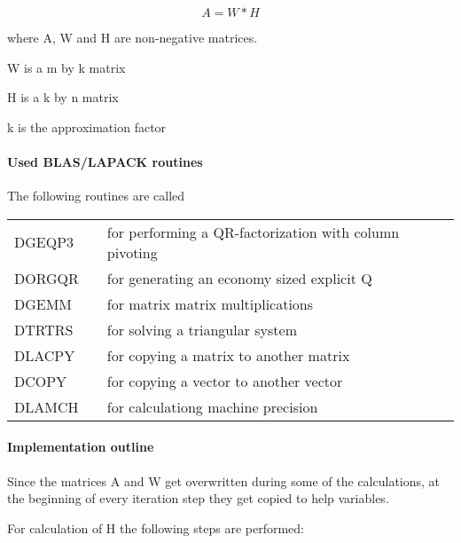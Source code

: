 \documentclass[a4paper,10pt]{scrartcl}
\begin{document}
					\begin{equation*}
						A = W * H
					\end{equation*}

 					where A, W and H are non-negative matrices.

 					W is a m by k matrix

 					H is a k by n matrix

 					k is the approximation factor

			\paragraph{Used BLAS/LAPACK routines}

					The following routines are called\newline

					\begin{tabular}{lcl}
						DGEQP3 && for performing a QR-factorization with column pivoting\\
						DORGQR && for generating an economy sized explicit Q\\
						DGEMM  && for matrix matrix multiplications\\
						DTRTRS && for solving a triangular system\\
						DLACPY && for copying a matrix to another matrix\\
						DCOPY  && for copying a vector to another vector\\
						DLAMCH && for calculationg machine precision
					\end{tabular}

			\paragraph{Implementation outline}


					Since the matrices A and W get overwritten during some of the calculations,
					at the beginning of every iteration step they get copied to help variables.
					\newline

					For calculation of H the following steps are performed:\newline
\end{document}
